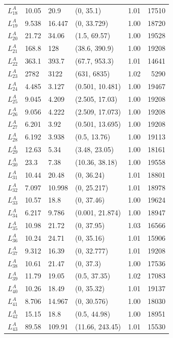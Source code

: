 \documentclass[
]{article}
\begin{document}
\begin{longtable}{llllrr}
$L^A_{18}$ & 10.05 & 20.9 & (0, 35.1) & 1.01 & 17510\\
$L^A_{19}$ & 9.538 & 16.447 & (0, 33.729) & 1.00 & 18720\\
$L^A_{20}$ & 21.72 & 34.06 & (1.5, 69.57) & 1.00 & 19528\\
\addlinespace
$L^A_{21}$ & 168.8 & 128 & (38.6, 390.9) & 1.00 & 19208\\
$L^A_{22}$ & 363.1 & 393.7 & (67.7, 953.3) & 1.01 & 14641\\
$L^A_{23}$ & 2782 & 3122 & (631, 6835) & 1.02 & 5290\\
$L^A_{24}$ & 4.485 & 3.127 & (0.501, 10.481) & 1.00 & 19467\\
$L^A_{25}$ & 9.045 & 4.209 & (2.505, 17.03) & 1.00 & 19208\\
\addlinespace
$L^A_{26}$ & 9.056 & 4.222 & (2.509, 17.073) & 1.00 & 19208\\
$L^A_{27}$ & 6.201 & 3.92 & (0.501, 13.695) & 1.00 & 19208\\
$L^A_{28}$ & 6.192 & 3.938 & (0.5, 13.76) & 1.00 & 19113\\
$L^A_{29}$ & 12.63 & 5.34 & (3.48, 23.05) & 1.00 & 18161\\
$L^A_{30}$ & 23.3 & 7.38 & (10.36, 38.18) & 1.00 & 19558\\
\addlinespace
$L^A_{31}$ & 10.44 & 20.48 & (0, 36.24) & 1.01 & 18801\\
$L^A_{32}$ & 7.097 & 10.998 & (0, 25.217) & 1.01 & 18978\\
$L^A_{33}$ & 10.57 & 18.8 & (0, 37.46) & 1.00 & 19624\\
$L^A_{34}$ & 6.217 & 9.786 & (0.001, 21.874) & 1.00 & 18947\\
$L^A_{35}$ & 10.98 & 21.72 & (0, 37.95) & 1.03 & 16566\\
\addlinespace
$L^A_{36}$ & 10.24 & 24.71 & (0, 35.16) & 1.01 & 15906\\
$L^A_{37}$ & 9.312 & 16.39 & (0, 32.777) & 1.01 & 19208\\
$L^A_{38}$ & 10.61 & 21.47 & (0, 37.3) & 1.00 & 17536\\
$L^A_{39}$ & 11.79 & 19.05 & (0.5, 37.35) & 1.02 & 17083\\
$L^A_{40}$ & 10.26 & 18.49 & (0, 35.32) & 1.01 & 19137\\
\addlinespace
$L^A_{41}$ & 8.706 & 14.967 & (0, 30.576) & 1.00 & 18030\\
$L^A_{42}$ & 15.15 & 18.8 & (0.5, 44.98) & 1.00 & 18951\\
$L^A_{43}$ & 89.58 & 109.91 & (11.66, 243.45) & 1.01 & 15530\\

\end{longtable}
\end{document}
